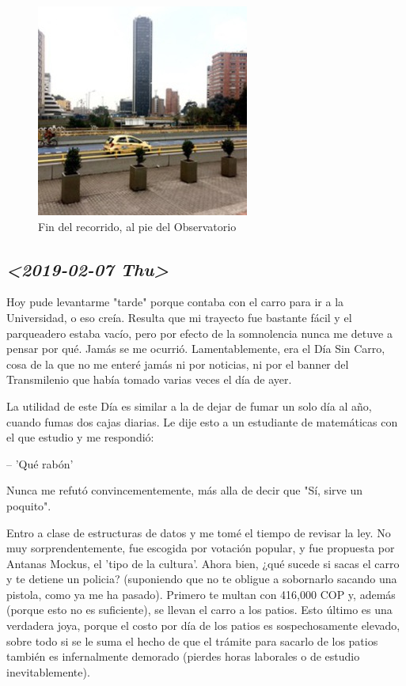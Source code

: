 \documentclass[11pt]{article}
\begin{document}
\begin{figure}[htb]
\centering
\includegraphics[width=.9\linewidth]{./img/septima-26.jpg}
\caption{Fin del recorrido, al pie del Observatorio}
\end{figure}
\subsection{\textit{<2019-02-07 Thu>}}
\label{sec-2-2}
Hoy pude levantarme "tarde" porque contaba con el carro para ir a la Universidad, o eso creía.
Resulta que mi trayecto fue bastante fácil y el parqueadero estaba vacío, pero por efecto de la somnolencia nunca
 me detuve a pensar por qué. Jamás se me ocurrió. Lamentablemente, era
el Día Sin Carro, cosa de la que no me enteré jamás ni por noticias, ni por el banner del Transmilenio que 
había tomado varias veces el día de ayer.

La utilidad de este Día es similar a la de dejar de fumar un solo día al año, cuando fumas dos cajas diarias.
 Le dije esto a un estudiante de matemáticas con el que estudio
y me respondió:

-- 'Qué rabón'

Nunca me refutó convincementemente, más alla de decir que "Sí, sirve un poquito".

Entro a clase de estructuras de datos y me tomé el tiempo de revisar la ley. No muy sorprendentemente, fue 
escogida por votación popular, y fue propuesta por Antanas Mockus, el 'tipo de la cultura'. Ahora bien, ¿qué sucede si
sacas el carro y te detiene un policia? (suponiendo que no te obligue a sobornarlo sacando una pistola, como ya me ha pasado). Primero
te multan con 416,000 COP y, además (porque esto no es suficiente), se llevan el carro a los patios.
Esto último es una verdadera joya, porque el costo por día de los patios es sospechosamente elevado, sobre todo si se le suma el 
hecho de que el trámite para sacarlo de los patios también es infernalmente demorado (pierdes horas laborales o de estudio inevitablemente). 
\end{document}
